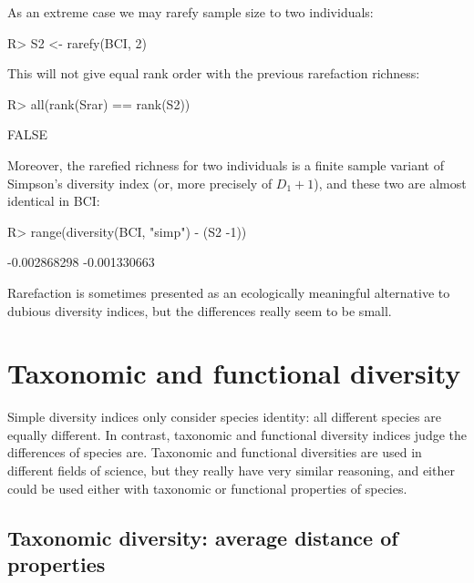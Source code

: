 \documentclass[article,nojss]{jss}
\begin{document}
As an extreme case we may rarefy sample size to two individuals:
\begin{Schunk}
\begin{Sinput}
R> S2 <- rarefy(BCI, 2)
\end{Sinput}
\end{Schunk}
This will not give equal rank order with the previous rarefaction
richness:
\begin{Schunk}
\begin{Sinput}
R> all(rank(Srar) == rank(S2))
\end{Sinput}
\begin{Soutput}
[1] FALSE
\end{Soutput}
\end{Schunk}
Moreover, the rarefied richness for two individuals is a finite
sample variant of Simpson's diversity index (or, more precisely of
$D_1 + 1$), and these two are almost identical in BCI:
\begin{Schunk}
\begin{Sinput}
R> range(diversity(BCI, "simp") - (S2 -1))
\end{Sinput}
\begin{Soutput}
[1] -0.002868298 -0.001330663
\end{Soutput}
\end{Schunk}
Rarefaction is sometimes presented as an ecologically meaningful
alternative to dubious diversity indices, but the differences really
seem to be small.

\section{Taxonomic and functional diversity}

Simple diversity indices only consider species identity: all different
species are equally different. In contrast, taxonomic and functional
diversity indices judge the differences of species
are. Taxonomic and functional diversities are used in different fields
of science, but they really have very similar reasoning, and either
could be used either with taxonomic or functional properties of
species.

\subsection{Taxonomic diversity: average distance of properties}
\end{document}
